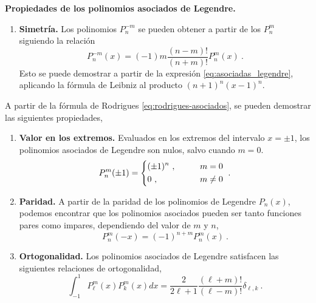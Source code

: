\begin{propiedad}
    \textbf{Propiedades de los polinomios asociados de Legendre.}

    \begin{enumerate}[series=asociadas]
        \item \textbf{Simetría.} Los polinomios $P^{-m}_n$ se pueden obtener a partir de los $P^{m}_n$ siguiendo la relación
        \begin{equation}
            P^{-m}_n(x) = (-1)m \frac{(n-m)!}{(n+m)!}P^{m}_n(x) \ .
        \end{equation}
        Esto se puede demostrar a partir de la expresión \eqref{eq:asociadas_legendre}, aplicando la fórmula de Leibniz al producto $(n+1)^n (x-1)^n$.
    \end{enumerate}

    A partir de la fórmula de Rodrigues \eqref{eq:rodrigues-asociados}, se pueden demostrar las siguientes propiedades,
    \begin{enumerate}[resume=asociadas]
        \item \textbf{Valor en los extremos.} Evaluados en los extremos del intervalo $x= \pm 1$, los polinomios asociados de Legendre son nulos, salvo cuando $m=0$.
        \begin{equation}
            P_n^m(\pm 1) = \begin{dcases}
                (\pm 1)^n \ , & \qquad m = 0 \\
                0 \ , & \qquad m \neq 0
            \end{dcases} \ .
        \end{equation}

        \item \textbf{Paridad.} A partir de la paridad de los polinomios de Legendre $P_n(x)$, podemos encontrar que los polinomios asociados pueden ser tanto funciones pares como impares, dependiendo del valor de $m$ y $n$,
        \begin{equation}
            P_n^m(-x) = (-1)^{n+m} P_n^m(x) \ .
        \end{equation}

        \item \textbf{Ortogonalidad.} Los polinomios asociados de Legendre satisfacen las siguientes relaciones de ortogonalidad,
        \begin{equation}
            \int_{-1}^1 P_\ell^m(x) P_k^m(x) dx = \frac{2}{2\ell + 1} \frac{(\ell + m)!}{(\ell - m)!} \delta_{\ell, k} \ .
        \end{equation}


\end{enumerate}
\end{propiedad}
